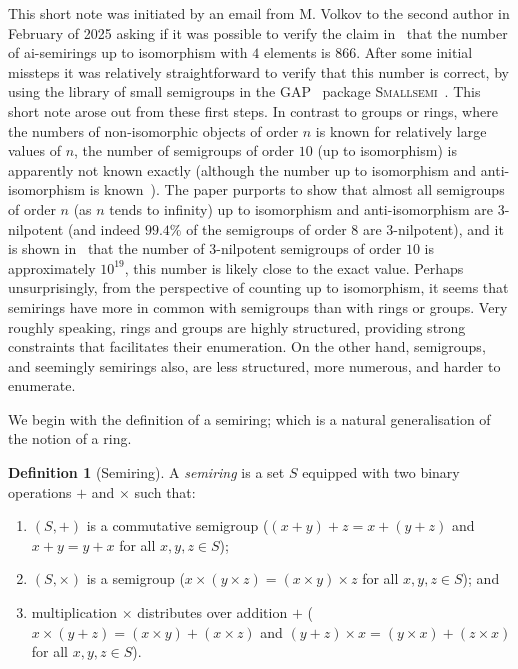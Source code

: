 \documentclass{article}
\theoremstyle{definition}
\newtheorem{defn}{Definition}[section]
\theoremstyle{plain}
\newcommand{\GAP}{\textsc{GAP}~\cite{GAP4}\xspace}
\newcommand{\Smallsemi}{\textsc{Smallsemi}~\cite{Smallsemi}\xspace}
\begin{document}
This short note was initiated by an email from M. Volkov to the second author
in February of 2025 asking if it was possible to verify the claim
in~\cite{Ren2025} that the number of ai-semirings up to isomorphism with $4$
elements is $866$. After some initial missteps it was relatively
straightforward to verify that this number is correct, by using the library of
small semigroups in the \GAP package \Smallsemi. This short note arose out from
these first steps. In contrast to groups or rings, where the numbers of
non-isomorphic objects of order $n$ is known for relatively large values of
$n$, the number of semigroups of order $10$ (up to isomorphism) is apparently
not known exactly (although the number up to isomorphism and anti-isomorphism
is known~\cite{Distler2012}). The paper \cite{Kleitman1976} purports to show
that almost all semigroups of order $n$ (as $n$ tends to infinity) up to
isomorphism and anti-isomorphism are $3$-nilpotent (and indeed $99.4\%$ of the
semigroups of order $8$ are $3$-nilpotent), and it is shown
in~\cite{Distler2012ab} that the number of $3$-nilpotent semigroups of order
$10$ is approximately $10 ^ {19}$, this number is likely close to the exact
value. Perhaps unsurprisingly, from the perspective of counting up to
isomorphism, it seems that semirings have more in common with semigroups than
with rings or groups. Very roughly speaking, rings and groups are highly
structured, providing strong constraints that facilitates their enumeration. On
the other hand, semigroups, and seemingly semirings also, are less structured,
more numerous, and harder to enumerate.

We begin with the definition of a semiring; which is a natural generalisation
of the notion of a ring.

\begin{defn}[Semiring]
  \label{def:semiring}
  A \emph{semiring} is a set \(S\) equipped with two binary
  operations \(+\) and  \(\times\) such that:
  \begin{enumerate}
    \item \((S, +)\) is a commutative semigroup ($(x + y) + z = x + (y + z)$
      and $x + y = y + x$ for all $x, y, z\in S$);
    \item \((S, \times)\) is a semigroup ($x\times (y \times z) = (x\times
      y)\times z$ for all $x,y, z\in S$); and
    \item multiplication $\times$ distributes over addition $+$
      ($x \times (y + z) = (x \times y) + (x \times z)$ and
      $(y + z) \times x = (y \times x) + (z \times x)$ for all $x, y, z \in S$).
  \end{enumerate}
\end{defn}
\end{document}
